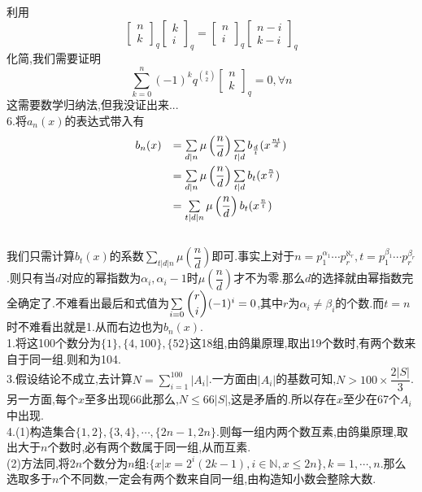 \documentclass[b5paper]{ctexart}
\begin{document}
利用\[\left[ \begin{array}{c}
n\\
k
\end{array}\right]_q\left[ \begin{array}{c}
k\\
i
\end{array}\right]_q=\left[ \begin{array}{c}
n\\
i
\end{array}\right]_q\left[ \begin{array}{c}
n-i\\
k-i
\end{array}\right]_q\]
化简,我们需要证明
\[\sum_{k=0}^n(-1)^kq^{\binom{k}{2}}\left[ \begin{array}{c}
n\\
k
\end{array}\right]_q=0,\forall n\]
这需要数学归纳法,但我没证出来...\\
6.将$a_n(x)$的表达式带入有
\[\begin{array}{rl}
b_n(x)& =\sum\limits_{d|n}\mu\left( \dfrac{n}{d}\right)\sum\limits_{t|d}b_{\frac{d}{t}}(x^{\frac{nt}{d}})\vspace{3pt}\\
&=\sum\limits_{d|n}\mu\left( \dfrac{n}{d}\right)\sum\limits_{t|d}b_{t}(x^{\frac{n}{t}})\vspace{3pt}\\
&=\sum\limits_{t|d|n}\mu\left( \dfrac{n}{d}\right) b_t(x^{\frac{n}{t}})\end{array}\]
\\
我们只需计算$b_t(x)$的系数$\sum\limits_{t|d|n}\mu\left( \dfrac{n}{d}\right) $即可.事实上对于$n=p_1^{\alpha_1}\cdots p_r^{\aleph_r},t=p_1^{\beta_1}\cdots p_r^{\beta_r}$.则只有当$d$对应的幂指数为$\alpha_i,\alpha_i-1$时$\mu(\dfrac{n}{d})$才不为零.那么$d$的选择就由幂指数完全确定了.不难看出最后和式值为$\sum\limits_{i=0}\dbinom{r}{i}(-1)^i=0$,其中$r$为$\alpha_i\neq \beta_i$的个数.而$t=n$时不难看出就是1.从而右边也为$b_n(x)$.\\
1.将这100个数分为$\{1\},\{4,100\},\{52\}$这18组,由鸽巢原理,取出19个数时,有两个数来自于同一组.则和为104.\\
3.假设结论不成立,去计算$N=\sum_{i=1}^{100}|A_i|$.一方面由$|A_i|$的基数可知,$N>100\times \dfrac{2|S|}{3}$.另一方面,每个$x$至多出现66此那么,$N\leq 66|S|$,这是矛盾的.所以存在$x$至少在67个$A_i$中出现.\\
4.(1)构造集合$\{1,2\},\{3,4\},\cdots,\{2n-1,2n\}$.则每一组内两个数互素,由鸽巢原理,取出大于$n$个数时,必有两个数属于同一组,从而互素.\\
(2)方法同,将$2n$个数分为$n$组:$\{x|x=2^i(2k-1),i\in\mathbb{N},x\leq 2n\},k=1,\cdots,n$.那么选取多于$n$个不同数,一定会有两个数来自同一组,由构造知小数会整除大数.
\end{document}
